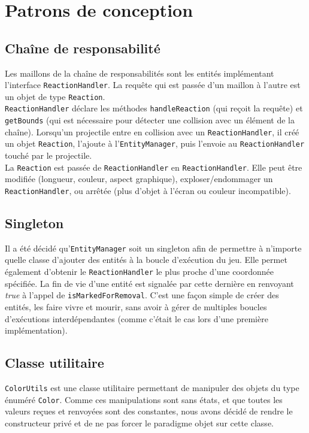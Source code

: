 \documentclass[11pt,a4paper,twoside,svgnames]{article}
\begin{document}
\section{Patrons de conception}
\subsection{Chaîne de responsabilité}
Les maillons de la chaîne de responsabilités sont les entités implémentant l'interface \texttt{ReactionHandler}. La requête qui est passée d'un maillon à l'autre est un objet de type \texttt{Reaction}.\\

\texttt{ReactionHandler} déclare les méthodes \texttt{handleReaction} (qui reçoit la requête) et \texttt{getBounds} (qui est nécessaire pour détecter une collision avec un élément de la chaîne). Lorsqu'un projectile entre en collision avec un \texttt{ReactionHandler}, il créé un objet \texttt{Reaction}, l'ajoute à l'\texttt{EntityManager}, puis l'envoie au \texttt{ReactionHandler} touché par le projectile.\\

La \texttt{Reaction} est passée de \texttt{ReactionHandler} en \texttt{ReactionHandler}. Elle peut être modifiée (longueur, couleur, aspect graphique), exploser/endommager un \texttt{ReactionHandler}, ou arrêtée (plus d'objet à l'écran ou couleur incompatible).

\subsection{Singleton}
Il a été décidé qu'\texttt{EntityManager} soit un singleton afin de permettre à n'importe quelle classe d'ajouter des entités à la boucle d'exécution du jeu. Elle permet également d'obtenir le \texttt{ReactionHandler} le plus proche d'une coordonnée spécifiée. La fin de vie d'une entité est signalée par cette dernière en renvoyant \textit{true} à l'appel de \texttt{isMarkedForRemoval}. C'est une façon simple de créer des entités, les faire vivre et mourir, sans avoir à gérer de multiples boucles d'exécutions interdépendantes (comme c'était le cas lors d'une première implémentation).

\subsection{Classe utilitaire}
\texttt{ColorUtils} est une classe utilitaire permettant de manipuler des objets du type énuméré \texttt{Color}. Comme ces manipulations sont sans états, et que toutes les valeurs reçues et renvoyées sont des constantes, nous avons décidé de rendre le constructeur privé et de ne pas forcer le paradigme objet sur cette classe.\\
\end{document}
